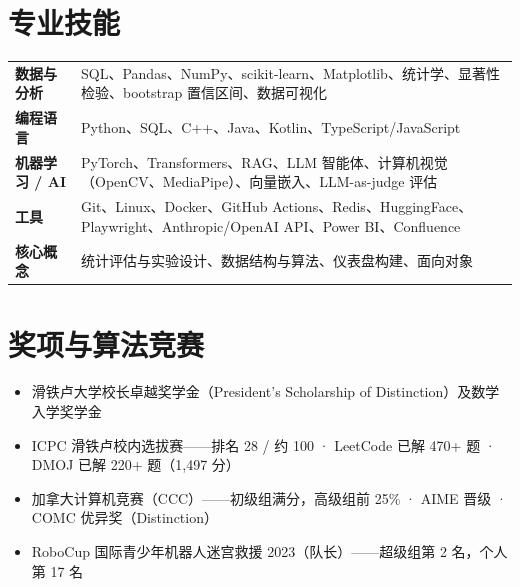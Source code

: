 \documentclass[a4paper,11pt]{article}
\newenvironment{bullets}
  {\begin{itemize}[leftmargin=1.5em,labelsep=0.5em,itemsep=1.5pt,topsep=1.5pt,parsep=0pt,partopsep=0pt]\small}
  {\end{itemize}\vspace{1pt}}
\begin{document}
\section{专业技能}
\begin{tabularx}{\textwidth}{@{}l X@{}}
  \textbf{数据与分析} & SQL、Pandas、NumPy、scikit-learn、Matplotlib、统计学、显著性检验、bootstrap 置信区间、数据可视化\\
  \textbf{编程语言} & Python、SQL、C++、Java、Kotlin、TypeScript/JavaScript\\
  \textbf{机器学习 / AI} & PyTorch、Transformers、RAG、LLM 智能体、计算机视觉（OpenCV、MediaPipe）、向量嵌入、LLM-as-judge 评估\\
  \textbf{工具} & Git、Linux、Docker、GitHub Actions、Redis、HuggingFace、Playwright、Anthropic/OpenAI API、Power BI、Confluence\\
  \textbf{核心概念} & 统计评估与实验设计、数据结构与算法、仪表盘构建、面向对象\\
\end{tabularx}

\section{奖项与算法竞赛}
\begin{bullets}
  \item 滑铁卢大学校长卓越奖学金（President's Scholarship of Distinction）及数学入学奖学金
  \item ICPC 滑铁卢校内选拔赛——排名 28 / 约 100 · LeetCode 已解 470+ 题 · DMOJ 已解 220+ 题（1{,}497 分）
  \item 加拿大计算机竞赛（CCC）——初级组满分，高级组前 25\% · AIME 晋级 · COMC 优异奖（Distinction）
  \item RoboCup 国际青少年机器人迷宫救援 2023（队长）——超级组第 2 名，个人第 17 名
\end{bullets}
\end{document}
